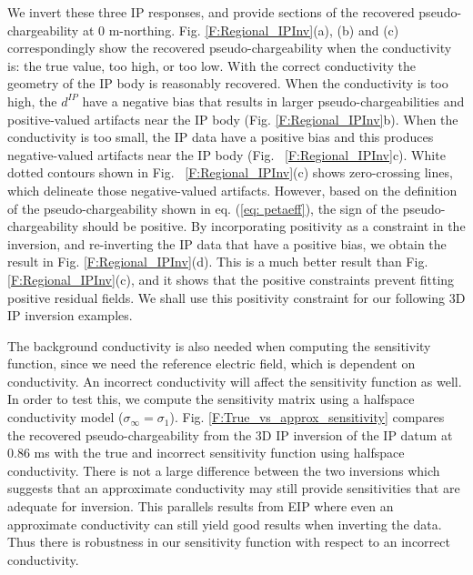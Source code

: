 \documentclass[extra,mreferee]{gji}
\newcommand{\siginf}{\sigma_\infty}
\newcommand{\dip}{d^{IP}}
\begin{document}
We invert these three IP responses, and provide sections of the recovered pseudo-chargeability at 0 m-northing. 
Fig. \ref{F:Regional_IPInv}(a), (b) and (c) correspondingly show the recovered pseudo-chargeability when the conductivity is: the true value, too high, or too low.  
With the correct conductivity the geometry of the IP body is reasonably recovered. 
When the conductivity is too high, the $\dip$ have a negative bias that results in larger pseudo-chargeabilities and positive-valued artifacts near the IP body (Fig. \ref{F:Regional_IPInv}b).  
When the conductivity is too small, the IP data have a positive bias and this produces  negative-valued artifacts near the IP body (Fig. ~\ref{F:Regional_IPInv}c). White dotted contours shown in Fig. ~\ref{F:Regional_IPInv}(c) shows zero-crossing lines, which delineate those negative-valued artifacts. However, based on the  definition of the pseudo-chargeability shown in eq. (\ref{eq: petaeff}), the sign of the pseudo-chargeability should be positive. By incorporating positivity as a constraint in the inversion, and re-inverting the IP data that have a positive bias, we obtain the result in  Fig. \ref{F:Regional_IPInv}(d).  This is a much better result than Fig. \ref{F:Regional_IPInv}(c), and it shows that the positive constraints prevent fitting positive residual fields.
 We shall use this positivity  constraint for our following 3D IP inversion examples. 

The background conductivity is also needed when computing the sensitivity function, since we need the reference electric field, which is dependent on conductivity. 
An incorrect conductivity will affect the sensitivity function as well. 
In order to test this, we compute the sensitivity matrix using a halfspace conductivity model ($\siginf = \sigma_1$). 
Fig. \ref{F:True_vs_approx_sensitivity} compares the recovered pseudo-chargeability from the 3D IP inversion of the IP datum at 0.86 ms with the true and incorrect sensitivity function using halfspace conductivity. 
There is not a large difference between the two inversions  which suggests that an approximate conductivity may still provide sensitivities that are adequate for inversion. This parallels results from EIP where even an approximate conductivity can still yield good results when inverting the data. Thus there is robustness in our sensitivity function with respect to an  incorrect conductivity.
\end{document}
